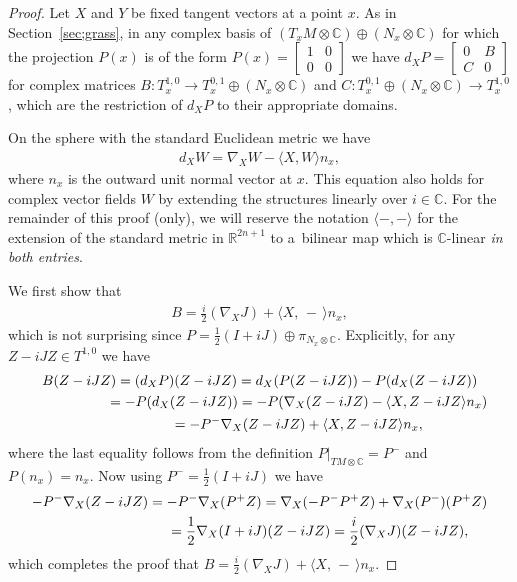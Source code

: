 \documentclass[pdftex]{sigma}
\numberwithin{equation}{section}
\newcommand{\R}{\mathbb{R}}
\newcommand{\CC}{\mathbb{C}}
\begin{document}
\begin{proof} Let $X$ and $Y$ be fixed tangent vectors at a point $x$. As in Section~\ref{sec;grass}, in any complex basis of $(T_xM \otimes \CC) \oplus (N_x \otimes \CC)$ for which the projection $P(x)$ is of the form
$P(x) = \left[\begin{smallmatrix}
1 & 0 \\
0& 0
\end{smallmatrix}\right]$ we have
$d_X P =\left[
\begin{smallmatrix}
0 & B \\
C& 0
\end{smallmatrix}\right] $ for complex matrices $B\colon T^{1,0}_x \to T^{0,1}_x \oplus ( N_x \otimes \CC )$ and $C \colon T^{0,1}_x \oplus ( N_x \otimes \CC ) \to T^{1,0}_x$, which are the restriction of $d_X P$ to their appropriate domains.

On the sphere with the standard Euclidean metric we have
\begin{gather} \label{eq;NablaSphere}
d_X W = \nabla_X W - \langle X,W \rangle n_x,
\end{gather}
where $n_x$ is the outward unit normal vector at $x$. This equation also holds for complex vector fields $W$ by extending the structures linearly over $i \in \CC$. For the remainder of this proof (only), we will reserve the notation $ \langle - , - \rangle$ for the extension of the standard metric in $\R^{2n+1}$ to a~bilinear map which is $\CC$-linear \emph{in both entries}.

We first show that
\begin{gather*}
B= \frac i 2 (\nabla_X J) + \langle X , \, -\, \rangle n_x,
\end{gather*}
which is not surprising since $P = \frac 1 2 (I + i J) \oplus \pi_{N_x \otimes \CC}$.
Explicitly, for any $Z - i JZ \in T^{1,0} $ we have
\begin{gather*}
B(Z-iJZ) = (d_XP)(Z-iJZ) = d_X(P(Z - iJZ)) - P(d_X(Z-iJZ)) \\
\hphantom{B(Z-iJZ)}{} = - P(d_X(Z-iJZ)) = -P ( \nabla_X (Z-iJZ) - \langle X,Z - iJZ \rangle n_x )\\
\hphantom{B(Z-iJZ)}{}= - P^- \nabla_X (Z-iJZ) + \langle X,Z - iJZ \rangle n_x ,
\end{gather*}
where the last equality follows from the definition $P\big|_{TM \otimes \CC} = P^- $ and $P(n_x) = n_x$. Now using $P^- = \frac 1 2 (I + i J)$ we have
\begin{gather*}
 -P^- \nabla_X (Z-iJZ) = -P^- \nabla_X (P^+ Z) = \nabla_X ( -P^- P^+ Z) + \nabla_X (P^-) (P^+ Z) \\
 \hphantom{-P^- \nabla_X (Z-iJZ)}{} =\frac 1 2 \nabla_X (I +iJ) (Z-iJZ) = \frac i 2 (\nabla_X J )(Z- i J Z),
\end{gather*}
which completes the proof that $B= \frac i 2 (\nabla_X J) + \langle X , \, -\, \rangle n_x$.


\end{proof}
\end{document}
